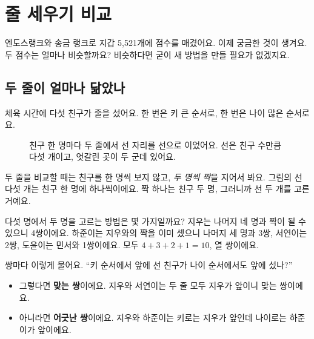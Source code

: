 \chapter{줄 세우기 비교}

엔도스랭크와 송금 랭크로 지갑 5,521개에 점수를 매겼어요.
이제 궁금한 것이 생겨요.
두 점수는 얼마나 비슷할까요?
비슷하다면 굳이 새 방법을 만들 필요가 없겠지요.

\section{두 줄이 얼마나 닮았나}

체육 시간에 다섯 친구가 줄을 섰어요.
한 번은 키 큰 순서로, 한 번은 나이 많은 순서로요.

\begin{figure}[h]
\centering
{}
\caption{친구 한 명마다 두 줄에서 선 자리를 선으로 이었어요. 선은 친구 수만큼 다섯 개이고, 엇갈린 곳이 두 군데 있어요.}
\end{figure}

두 줄을 비교할 때는 친구를 한 명씩 보지 않고, \emph{두 명씩 짝}을 지어서 봐요.
그림의 선 다섯 개는 친구 한 명에 하나씩이에요.
짝 하나는 친구 두 명, 그러니까 선 두 개를 고른 거예요.

다섯 명에서 두 명을 고르는 방법은 몇 가지일까요?
지우는 나머지 네 명과 짝이 될 수 있으니 4쌍이에요.
하준이는 지우와의 짝을 이미 셌으니 나머지 세 명과 3쌍,
서연이는 2쌍, 도윤이는 민서와 1쌍이에요.
모두 $4+3+2+1=10$, 열 쌍이에요.

쌍마다 이렇게 물어요.
“키 순서에서 앞에 선 친구가 나이 순서에서도 앞에 섰나?”

\begin{itemize}
\item 그렇다면 \textbf{맞는 쌍}이에요. 지우와 서연이는 두 줄 모두 지우가 앞이니 맞는 쌍이에요.
\item 아니라면 \textbf{어긋난 쌍}이에요. 지우와 하준이는 키로는 지우가 앞인데 나이로는 하준이가 앞이에요.
\end{itemize}

